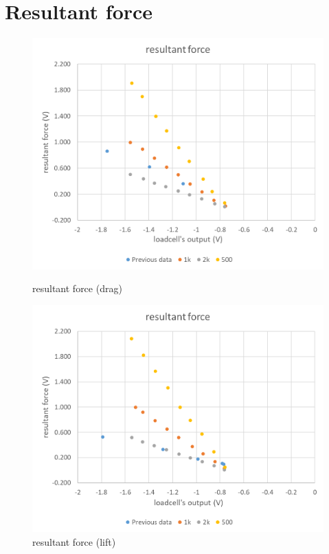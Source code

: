 \documentclass[a4paper]{jsarticle}
\begin{document}
\section{Resultant force}
\begin{figure}[htbp]
    \footnotesize
    \begin{center}
        \includegraphics[width=130mm]{../images/resultantforce_drag.png}
        \caption{resultant force (drag)}
        \includegraphics[width=130mm]{../images/resultantforce_lift.png}
        \caption{resultant force (lift)}
    \end{center}
\end{figure}
\end{document}
